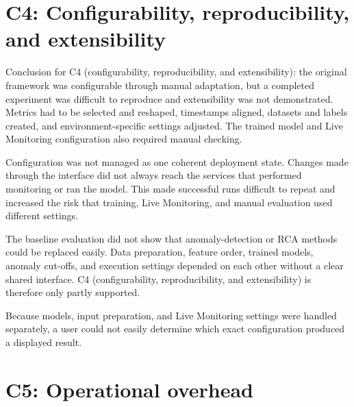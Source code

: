 \section{C4: Configurability, reproducibility, and extensibility}
Conclusion for C4 (configurability, reproducibility, and extensibility): the original framework was configurable through manual adaptation, but a completed experiment was difficult to reproduce and extensibility was not demonstrated. Metrics had to be selected and reshaped, timestamps aligned, datasets and labels created, and environment-specific settings adjusted. The trained model and Live Monitoring configuration also required manual checking.

Configuration was not managed as one coherent deployment state. Changes made through the interface did not always reach the services that performed monitoring or ran the model. This made successful runs difficult to repeat and increased the risk that training, Live Monitoring, and manual evaluation used different settings.

The baseline evaluation did not show that anomaly-detection or RCA methods could be replaced easily. Data preparation, feature order, trained models, anomaly cut-offs, and execution settings depended on each other without a clear shared interface. C4 (configurability, reproducibility, and extensibility) is therefore only partly supported.

Because models, input preparation, and Live Monitoring settings were handled separately, a user could not easily determine which exact configuration produced a displayed result.

\section{C5: Operational overhead}


